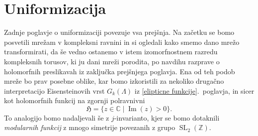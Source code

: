 \documentclass[mat1]{fmfdelo}
\numberwithin{equation}{section}
\newcommand{\Z}{\mathbb Z}
\newcommand{\C}{\mathbb C}
\newcommand{\HH}{\mathfrak{H}}
\newcommand{\CM}{\mathbb C ^*}
\newcommand{\htp}{\simeq}
\renewcommand\Im{\operatorname{Im}}%
\newcommand{\olsi}[1]{\,\overline{\!{#1}}} %
\newcommand{\kom}[1]{
    \underline{//#1}
}
\theoremstyle{definition}
\begin{document}









\section{Uniformizacija} \label{poglavje izomorfizem}

Zadnje poglavje o uniformizaciji povezuje vsa prejšnja. Na začetku 
%
%
se bomo posvetili mrežam v kompleksni ravnini in si ogledali kako smemo dano mrežo transformirati, da še vedno ostanemo v istem izomorfnostnem razredu kompleksnih torusov, ki ju dani mreži porodita, po navdihu razprave o holomorfnih preslikavah iz zaključka prejšnjega poglavja. Ena od teh podob mreže bo prav posebne oblike, kar bomo izkoristili za nekoliko drugačno interpretacijo Eisensteinovih vrst $G_k(\Lambda)$ iz \ref{elipticne funkcije}.\ poglavja, in sicer kot holomorfnih funkcij na zgornji polravnivni
\[
    \HH = \{z \in \C \mid \Im(z) > 0\}.
\]
To analogijo bomo nadaljevali še z $j$-invarianto, kjer se bomo dotaknili \emph{modularnih funkcij} z mnogo simetrije povezanih z grupo $\operatorname{SL}_2(\Z)$.
\end{document}
